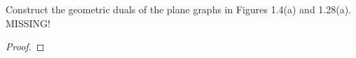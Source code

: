 \prob
{
    Construct the geometric duals of the plane graphs in Figures 1.4(a) and 1.28(a). MISSING!
}
\begin{proof}
\end{proof}